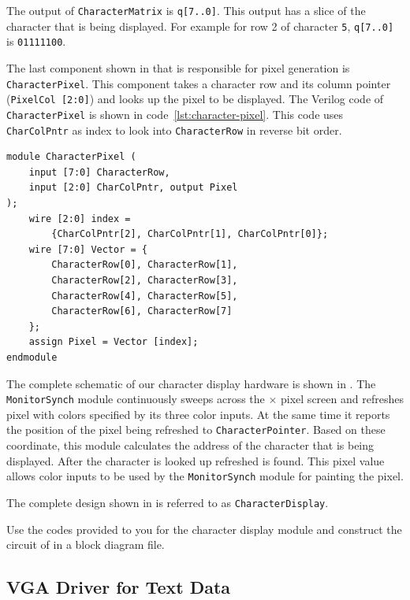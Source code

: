 \documentclass[12pt, logo=tehranDLDL/ut]{tehranDLDL}
\begin{document}
The output of \lstinline{CharacterMatrix} is \lstinline{q[7..0]}. This output has a slice of the character that is being displayed. For example for row 2 of character \texttt{5}, \lstinline{q[7..0]} is \lstinline[language=mif]{01111100}.

The last component shown in  that is responsible for pixel generation is \lstinline{CharacterPixel}. This component takes a character row and its column pointer (\lstinline{PixelCol [2:0]}) and looks up the pixel to be displayed. The Verilog code of \lstinline{CharacterPixel} is shown in code~\ref{lst:character-pixel}. This code uses \lstinline{CharColPntr} as index to look into \lstinline{CharacterRow} in reverse bit order.

\begin{lstlisting}[caption={Looking up \lstinline{CharacterPixel}\label{lst:character-pixel}}]
module CharacterPixel (
    input [7:0] CharacterRow, 
    input [2:0] CharColPntr, output Pixel
);
    wire [2:0] index = 
        {CharColPntr[2], CharColPntr[1], CharColPntr[0]};
    wire [7:0] Vector = {
        CharacterRow[0], CharacterRow[1], 
        CharacterRow[2], CharacterRow[3],
        CharacterRow[4], CharacterRow[5],
        CharacterRow[6], CharacterRow[7]
    };
    assign Pixel = Vector [index];
endmodule
\end{lstlisting}

The complete schematic of our character display hardware is shown in . The \lstinline{MonitorSynch} module continuously sweeps across the $\times$ pixel screen and refreshes pixel with colors specified by its three color inputs. At the same time it reports the position of the pixel being refreshed to \lstinline{CharacterPointer}. Based on these coordinate, this module calculates the address of the character that is being displayed. After the character is looked up refreshed is found. This pixel value allows color inputs to be used by the \lstinline{MonitorSynch} module for painting the pixel.

The complete design shown in  is referred to as \lstinline{CharacterDisplay}.

Use the codes provided to you for the character display module and construct the circuit of  in a block diagram file. 

\designverification{}

\subsection{VGA Driver for Text Data}
\end{document}
